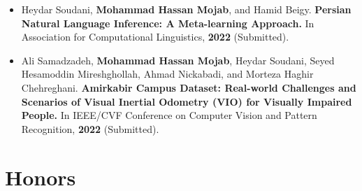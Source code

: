 \documentclass[11pt,a4paper,roman]{moderncv} %
\begin{document}
\begin{itemize}
	\item Heydar Soudani, \textbf{Mohammad Hassan Mojab}, and Hamid Beigy. \textbf{Persian Natural Language Inference: A Meta-learning Approach.} In Association for Computational Linguistics, \textbf{2022} (Submitted).
	
	\vspace{10pt}
	
	\item Ali Samadzadeh, \textbf{Mohammad Hassan Mojab}, Heydar Soudani, Seyed Hesamoddin Mireshghollah, Ahmad Nickabadi, and Morteza Haghir Chehreghani. \textbf{Amirkabir Campus Dataset: Real-world Challenges and Scenarios of Visual Inertial Odometry (VIO) for Visually Impaired People.} In IEEE/CVF Conference on Computer Vision and Pattern Recognition, \textbf{2022} (Submitted).
\end{itemize}

\section{Honors}
\end{document}
